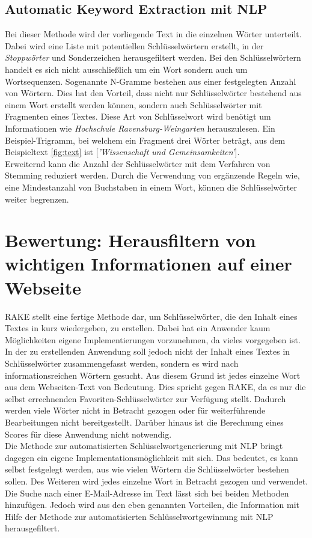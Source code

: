 	\subsection{Automatic Keyword Extraction mit NLP}
	\label{sec:Automatic Keyword Extraction}
	Bei dieser Methode wird der vorliegende Text in die einzelnen Wörter unterteilt. Dabei wird eine Liste mit potentiellen Schlüsselwörtern erstellt, in der \textit{Stoppwörter} und Sonderzeichen herausgefiltert werden. Bei den Schlüsselwörtern handelt es sich nicht ausschließlich um ein Wort sondern auch um Wortsequenzen. Sogenannte N-Gramme bestehen aus einer festgelegten Anzahl von Wörtern. Dies hat den Vorteil, dass nicht nur Schlüsselwörter bestehend aus einem Wort erstellt werden können, sondern auch Schlüsselwörter mit Fragmenten eines Textes. Diese Art von Schlüsselwort wird benötigt um Informationen wie \textit{Hochschule Ravensburg-Weingarten} herauszulesen. Ein Beispiel-Trigramm, bei welchem ein Fragment drei Wörter beträgt, aus dem Beispieltext \ref{fig:text}  ist [\textit{'Wissenschaft und Gemeinsamkeiten'}].\\
	Erweiternd kann die Anzahl der Schlüsselwörter mit dem Verfahren von Stemming reduziert werden. Durch die Verwendung von ergänzende Regeln wie, eine Mindestanzahl von Buchstaben in einem Wort, können die Schlüsselwörter weiter begrenzen.

 

\section{Bewertung: Herausfiltern von wichtigen Informationen auf einer Webseite}
RAKE stellt eine fertige Methode dar, um Schlüsselwörter, die den Inhalt eines Textes in kurz wiedergeben, zu erstellen. Dabei hat ein Anwender kaum Möglichkeiten eigene Implementierungen vorzunehmen, da vieles vorgegeben ist. In der zu erstellenden Anwendung soll jedoch nicht der Inhalt eines Textes in Schlüsselwörter zusammengefasst werden, sondern es wird nach informationsreichen Wörtern gesucht. Aus diesem Grund ist jedes einzelne Wort aus dem Webseiten-Text von Bedeutung. Dies spricht gegen RAKE, da es nur die selbst errechnenden Favoriten-Schlüsselwörter zur Verfügung stellt. Dadurch werden viele Wörter nicht in Betracht gezogen oder für weiterführende Bearbeitungen nicht bereitgestellt. Darüber hinaus ist die Berechnung eines Scores für diese Anwendung nicht notwendig.\\
Die Methode zur automatisierten Schlüsselwortgenerierung mit NLP bringt dagegen ein eigene Implementationsmöglichkeit mit sich. Das bedeutet, es kann selbst festgelegt werden, aus wie vielen Wörtern die Schlüsselwörter bestehen sollen. Des Weiteren wird jedes einzelne Wort in Betracht gezogen und verwendet.\\ Die Suche nach einer E-Mail-Adresse im Text lässt sich bei beiden Methoden hinzufügen. Jedoch wird aus den eben genannten Vorteilen, die Information mit Hilfe der Methode zur automatisierten Schlüsselwortgewinnung mit NLP herausgefiltert.


